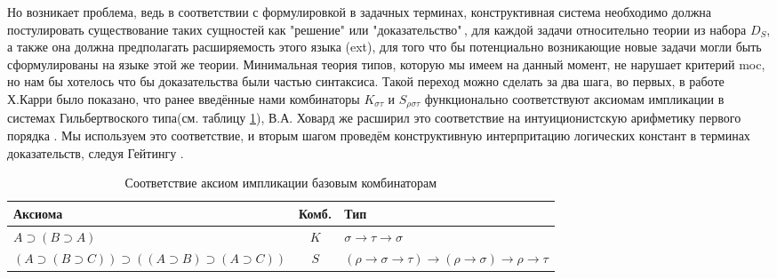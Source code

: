\documentclass[14pt]{extarticle}
\begin{document}
	
	
	Но возникает проблема, ведь в соответствии с формулировкой в задачных терминах, конструктивная система необходимо должна постулировать существование таких сущностей как "решение" или "доказательство"\,, для каждой задачи относительно теории из набора \(D_S\), а также она должна предполагать расширяемость этого языка (ext), для того что бы потенциально возникающие новые задачи могли быть сформулированы на языке этой же теории. Минимальная теория типов, которую мы имеем на данный момент, не нарушает критерий moc, но нам бы хотелось что бы доказательства были частью синтаксиса. Такой переход можно сделать за два шага, во первых, в работе Х.Карри \cite{curry1958} было показано, что ранее введённые нами комбинаторы \(K_{\sigma\tau}\) и \(S_{\rho\sigma\tau}\) функционально соответствуют аксиомам импликации в системах Гильбертвоского типа(см. таблицу \ref{tab:hilbert-combinators}), В.А. Ховард же расширил это соответствие на интуиционистскую арифметику первого порядка \cite{howard1980}. Мы используем это соответствие, и вторым шагом проведём конструктивную интерпритацию логических констант в терминах доказательств, следуя Гейтингу \cite[121]{heyting1965intuitionism}.  
	\begin{table}[h]
		\small 
		\centering
		\begin{tabularx}{\linewidth}{>{\raggedright\arraybackslash}X c >{\raggedright\arraybackslash}X}
			\toprule
			\textbf{Аксиома} &
			\textbf{Комб.} &
			\textbf{Тип} \\
			\midrule
			$A \supset (B \supset A)$ &
			$K$ &
			$\sigma \to \tau \to \sigma$ \\[1ex]
			
			$(A \supset (B \supset C)) \supset ((A \supset B) \supset (A \supset C))$ &
			$S$ &
			$(\rho \to \sigma \to \tau) \to (\rho \to \sigma) \to \rho \to \tau$ \\
			\bottomrule
		\end{tabularx}
		\caption{Соответствие аксиом импликации базовым комбинаторам}
		\label{tab:hilbert-combinators}
	\end{table}
	
\end{document}
